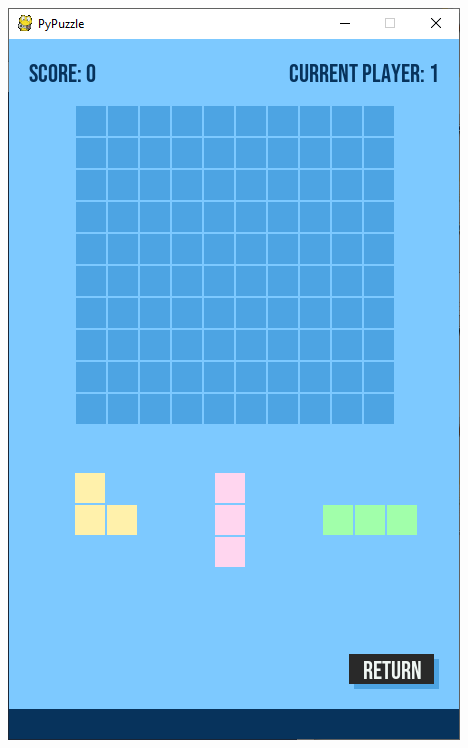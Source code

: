 \documentclass[a4paper]{report}
\begin{document}
\begin{enumerate}
        \includegraphics[scale=0.3]{images/3-ingamestart.png}

\end{enumerate}
\end{document}

